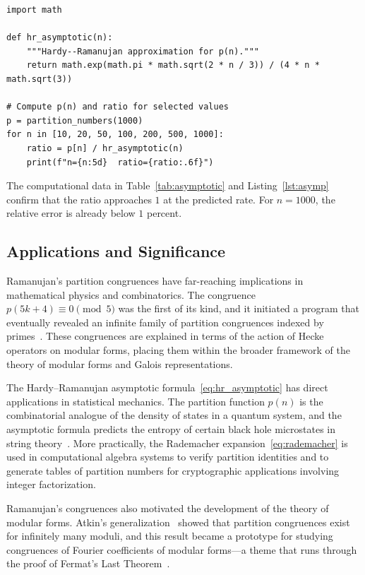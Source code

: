 \documentclass[10pt]{amsart}
\theoremstyle{plain}
\theoremstyle{definition}
\theoremstyle{remark}
\begin{document}
\begin{lstlisting}[label=lst:asymp, caption={Comparing exact partition numbers with the Hardy--Ramanujan asymptotic formula.}]
import math

def hr_asymptotic(n):
    """Hardy--Ramanujan approximation for p(n)."""
    return math.exp(math.pi * math.sqrt(2 * n / 3)) / (4 * n * math.sqrt(3))

# Compute p(n) and ratio for selected values
p = partition_numbers(1000)
for n in [10, 20, 50, 100, 200, 500, 1000]:
    ratio = p[n] / hr_asymptotic(n)
    print(f"n={n:5d}  ratio={ratio:.6f}")
\end{lstlisting}

The computational data in Table~\ref{tab:asymptotic} and
Listing~\ref{lst:asymp} confirm that the ratio approaches $1$ at the
predicted rate. For $n=1000$, the relative error is already below $1$
percent.

\subsection{Applications and Significance}

Ramanujan's partition congruences have far-reaching implications in
mathematical physics and combinatorics. The congruence~$p(5k+4) \equiv
0 \pmod{5}$ was the first of its kind, and it initiated a program that
eventually revealed an infinite family of partition congruences indexed
by primes~\cite{atkin_1966}. These congruences are explained in terms
of the action of Hecke operators on modular forms, placing them within
the broader framework of the theory of modular forms and Galois
representations.

The Hardy--Ramanujan asymptotic formula~\eqref{eq:hr_asymptotic} has
direct applications in statistical mechanics. The partition function
$p(n)$ is the combinatorial analogue of the density of states in a
quantum system, and the asymptotic formula predicts the entropy of
certain black hole microstates in string theory~\cite{maloney_string}.
More practically, the Rademacher expansion~\eqref{eq:rademacher} is
used in computational algebra systems to verify partition identities
and to generate tables of partition numbers for cryptographic
applications involving integer factorization.

Ramanujan's congruences also motivated the development of the theory
of modular forms. Atkin's generalization~\cite{atkin_1966} showed that
partition congruences exist for infinitely many moduli, and this result
became a prototype for studying congruences of Fourier coefficients of
modular forms---a theme that runs through the proof of Fermat's Last
Theorem~\cite{wilson_fermat}.
\end{document}
